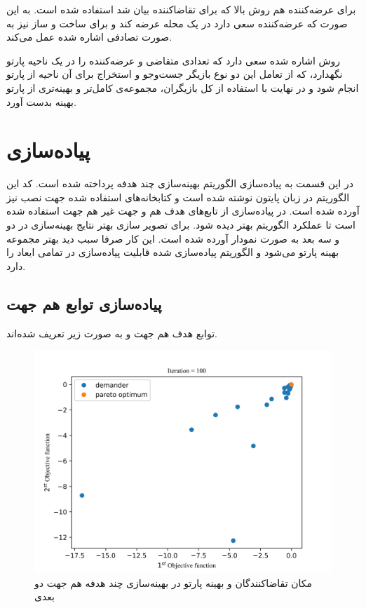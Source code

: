  برای عرضه‌کننده هم روش بالا که برای تقاضاکننده بیان شد استفاده شده است. به این صورت که عرضه‌کننده سعی دارد در یک محله عرضه کند و برای ساخت و ساز نیز به صورت تصادفی اشاره شده عمل می‌کند.
 
 
 روش اشاره شده سعی دارد که تعدادی متقاضی و عرضه‌کننده را در یک ناحیه پارتو نگهدارد، که از تعامل این دو نوع بازیگر جست‌وجو و استخراج برای آن ناحیه از پارتو انجام شود و در نهایت با استفاده از کل بازیگران، مجموعه‌ی کامل‌تر و بهینه‌تری از پارتو بهینه بدست آورد.
 
 \section{پیاده‌سازی}
 در این قسمت به پیاده‌سازی الگوریتم بهینه‌سازی چند هدفه پرداخته شده است. کد این الگوریتم در زبان پایتون
 نوشته شده است و کتابخانه‌های استفاده شده جهت نصب نیز آورده شده است. در پیاده‌سازی از تابع‌های هدف هم و جهت‌ غیر هم جهت استفاده شده است تا عملکرد الگوریتم بهتر دیده شود.
 برای تصویر سازی بهتر نتایج بهینه‌سازی در دو و سه بعد به صورت نمودار آورده شده است. این کار صرفا سبب دید بهتر مجموعه بهینه پارتو می‌شود و الگوریتم پیاده‌سازی شده قابلیت پیاده‌سازی در تمامی ایعاد را دارد.
 
\subsection{پیاده‌سازی توابع هم جهت}
 توابع هدف هم جهت و به صورت زیر تعریف شده‌اند.

\begin{figure}[H]
	\includegraphics[width=16cm]{../Figure/results/cooperative_2d.png}
	\centering
	\caption{مکان تقاضا‌کنندگان و بهینه پارتو در بهینه‌سازی چند هدفه هم جهت دو بعدی}
\end{figure}

